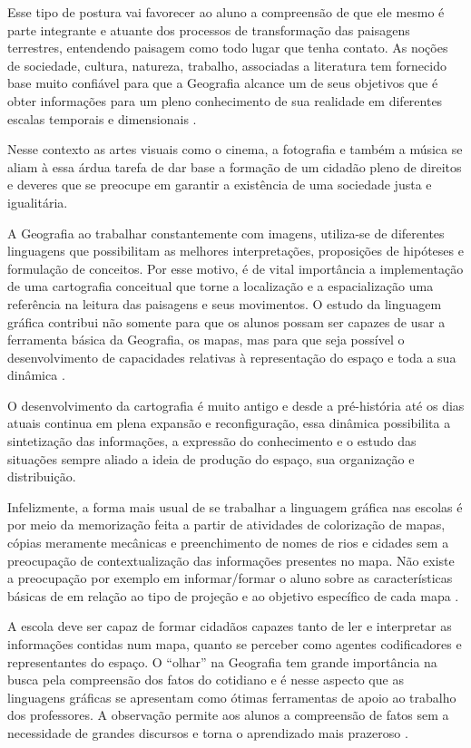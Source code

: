 \begin{refsection}
    Esse tipo de postura vai favorecer ao aluno a compreensão de que ele mesmo é parte integrante e atuante dos processos de transformação das paisagens terrestres, entendendo paisagem como todo lugar que tenha contato. As noções de sociedade, cultura, natureza, trabalho, associadas a literatura tem fornecido base muito confiável para que a Geografia alcance um de seus objetivos que é obter informações para um pleno conhecimento de sua realidade em diferentes escalas temporais e dimensionais \cite{ParâmetrosCurricularesGeografia2001}.  

    Nesse contexto as artes visuais como o cinema, a fotografia e também a música se aliam à essa árdua tarefa de dar base a formação de um cidadão pleno de direitos e deveres que se preocupe em garantir a existência de uma sociedade justa e igualitária. 

    A Geografia ao trabalhar constantemente com imagens, utiliza-se de diferentes linguagens que possibilitam as melhores interpretações, proposições de hipóteses e formulação de conceitos. Por esse motivo, é de vital importância a implementação de uma cartografia conceitual que torne a localização e a espacialização uma referência na leitura das paisagens e seus movimentos. O estudo da linguagem gráfica contribui não somente para que os alunos possam ser capazes de usar a ferramenta básica da Geografia, os mapas, mas para que seja possível o desenvolvimento de capacidades relativas à representação do espaço e toda a sua dinâmica \cite{ALMEIDA2011Novos}. 

    O desenvolvimento da cartografia é muito antigo e desde a pré-história até os dias atuais continua em plena expansão e reconfiguração, essa dinâmica possibilita a sintetização das informações, a expressão do conhecimento e o estudo das situações sempre aliado a ideia de produção do espaço, sua organização e distribuição.  

    Infelizmente, a forma mais usual de se trabalhar a linguagem gráfica nas escolas é por meio da memorização feita a partir de atividades de colorização de mapas, cópias meramente mecânicas e preenchimento de nomes de rios e cidades sem a preocupação de contextualização das informações presentes no mapa. Não existe a preocupação por exemplo em informar/formar o aluno sobre as características básicas de em relação ao tipo de projeção e ao objetivo específico de cada mapa \cite{ParâmetrosCurricularesGeografia2001}.  

    A escola deve ser capaz de formar cidadãos capazes tanto de ler e interpretar as informações contidas num mapa, quanto se perceber como agentes codificadores e representantes do espaço. O “olhar” na Geografia tem grande importância na busca pela compreensão dos fatos do cotidiano e é nesse aspecto que as linguagens gráficas se apresentam como ótimas ferramentas de apoio ao trabalho dos professores. A observação permite aos alunos a compreensão de fatos sem a necessidade de grandes discursos e torna o aprendizado mais prazeroso \cite{ALMEIDA2011Novos}. 


\end{refsection}
